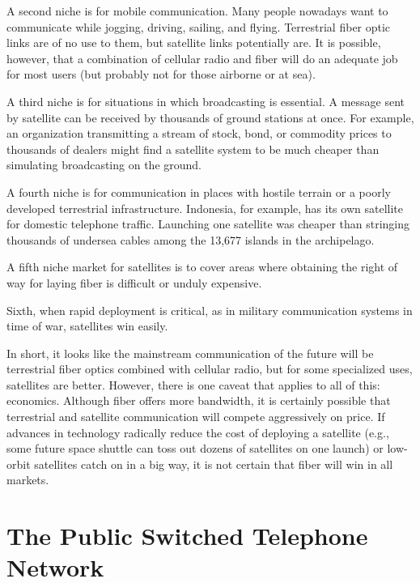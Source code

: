 \documentclass[b5paper,11pt]{memoir}
\begin{document}
A second niche is for mobile communication. Many people nowadays want to
communicate while jogging, driving, sailing, and flying. Terrestrial
fiber optic links are of no use to them, but satellite links potentially
are. It is possible, however, that a combination of cellular radio and
fiber will do an adequate job for most users (but probably not for those
airborne or at sea).

A third niche is for situations in which broadcasting is essential. A
message sent by satellite can be received by thousands of ground
stations at once. For example, an organization transmitting a stream of
stock, bond, or commodity prices to thousands of dealers might find a
satellite system to be much cheaper than simulating broadcasting on the
ground.

A fourth niche is for communication in places with hostile terrain or a
poorly developed terrestrial infrastructure. Indonesia, for example, has
its own satellite for domestic telephone traffic. Launching one
satellite was cheaper than stringing thousands of undersea cables among
the 13,677 islands in the archipelago.

A fifth niche market for satellites is to cover areas where obtaining
the right of way for laying fiber is difficult or unduly expensive.

Sixth, when rapid deployment is critical, as in military communication
systems in time of war, satellites win easily.

In short, it looks like the mainstream communication of the future will
be terrestrial fiber optics combined with cellular radio, but for some
specialized uses, satellites are better. However, there is one caveat
that applies to all of this: economics. Although fiber offers more
bandwidth, it is certainly possible that terrestrial and satellite
communication will compete aggressively on price. If advances in
technology radically reduce the cost of deploying a satellite (e.g.,
some future space shuttle can toss out dozens of satellites on one
launch) or low-orbit satellites catch on in a big way, it is not certain
that fiber will win in all markets.

\protect\hypertarget{0130661023_ch02lev1sec5.html}{}{}

\protect\hypertarget{0130661023_ch02lev1sec5.htmlux5cux23ch02lev1sec5}{}{}

\section{The Public Switched Telephone Network}
\end{document}
